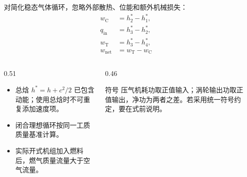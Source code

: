 \begin{frame}[t,shrink]{}
对简化稳态气体循环，忽略外部散热、位能和额外机械损失：
$$
\begin{aligned}
w_{\mathrm{C}}&=h_2^*-h_1^*,\\
q_{\mathrm{in}}&=h_3^*-h_2^*,\\
w_{\mathrm{T}}&=h_3^*-h_4^*,\\
w_{\mathrm{net}}&=w_{\mathrm{T}}-w_{\mathrm{C}}
\end{aligned}
$$
\begin{columns}[T,onlytextwidth]
\begin{column}{0.51\textwidth}
  \begin{itemize}
    \item 总焓 \(h^*=h+c^2/2\) 已包含动能；使用总焓时不可重复添加速度项。
    \item 闭合理想循环按同一工质质量基准计算。
    \item 实际开式机组加入燃料后，燃气质量流量大于空气流量。
  \end{itemize}
\end{column}
\begin{column}{0.46\textwidth}
  \begin{amberbox}{符号}
  \small 压气机耗功取正值输入；涡轮输出功取正值输出，净功为两者之差。若采用统一符号约定，要在式前说明。
  \end{amberbox}
\end{column}
\end{columns}
\end{frame}

